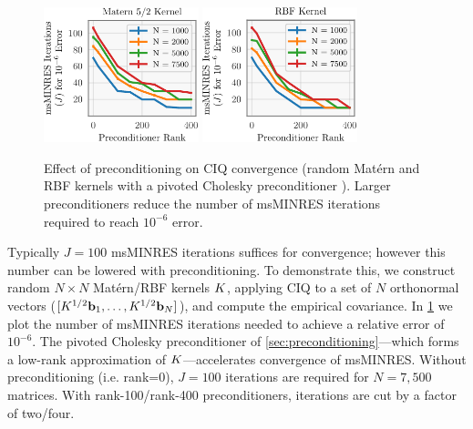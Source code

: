 \begin{figure}[t!]
	\centering
	\includegraphics[width=0.4\textwidth]{figures/precond_result.pdf}
  \quad
	\includegraphics[width=0.4\textwidth]{figures/precond_result_rbf.pdf}
  \caption[
    Effect of preconditioning on CIQ convergence.
  ]{
    Effect of preconditioning on CIQ convergence (random Mat\'ern and RBF kernels with a pivoted Cholesky preconditioner \citep{gardner2018gpytorch}).
    Larger preconditioners reduce the number of msMINRES iterations required to reach $10^{-6}$ error.
  }
  \label{fig:precond_result}
\end{figure}

Typically $J=100$ msMINRES iterations suffices for convergence; however this number can be lowered with preconditioning.
To demonstrate this, we construct  random $N \times N$ Mat\'ern/RBF kernels $K$, applying CIQ to a set of $N$ orthonormal vectors ($[K^{1/2} \mathbf{b}_{1}, \ldots, K^{1/2} \mathbf{b}_{N}]$), and compute the empirical covariance.
In \cref{fig:precond_result} we plot the number of msMINRES iterations needed to achieve a relative error of $10^{-6}$.
The pivoted Cholesky preconditioner of \cref{sec:preconditioning}---which forms a low-rank approximation of $K$---accelerates convergence of msMINRES.
Without preconditioning (i.e. rank=0), $J=100$ iterations are required for $N=7,\!500$ matrices.
With rank-100/rank-400 preconditioners, iterations are cut by a factor of two/four.

